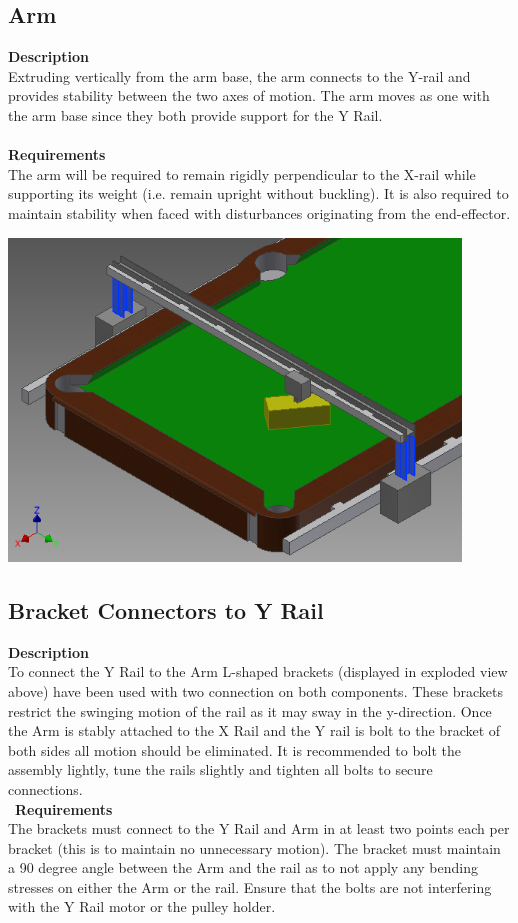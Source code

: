 \documentclass[titlepage]{article}
\begin{document}
\newpage
\subsection{Arm}
\textbf{Description}\\
Extruding vertically from the arm base, the arm connects to the Y-rail and provides stability between the two axes of motion. The arm moves as one with the arm base since they both provide support for the Y Rail.\\~\\
\textbf{Requirements}\\
The arm will be required to remain rigidly perpendicular to the X-rail while supporting its weight (i.e. remain upright without buckling). It is also required to maintain stability when faced with disturbances originating from the end-effector.
\begin{center}
	\includegraphics[width = 0.9\textwidth]{arms.png}	%
\label{fig:armFig}
\end{center}

\subsection{Bracket Connectors to Y Rail}
\textbf{Description}\\
To connect the Y Rail to the Arm L-shaped brackets (displayed in exploded view above) have been used with two connection on both components. These brackets restrict the swinging motion of the rail as it may sway in the y-direction. Once the Arm is stably attached to the X Rail and the Y rail is bolt to the bracket of both sides all motion should be eliminated. It is recommended to bolt the assembly lightly, tune the rails slightly and tighten all bolts to secure connections.\\\
\textbf{Requirements}\\
The brackets must connect to the Y Rail and Arm in at least two points each per bracket (this is to maintain no unnecessary motion). The bracket must maintain a 90 degree angle between the Arm and the rail as to not apply any bending stresses on either the Arm or the rail. Ensure that the bolts are not interfering with the Y Rail motor or the pulley holder.
\end{document}
